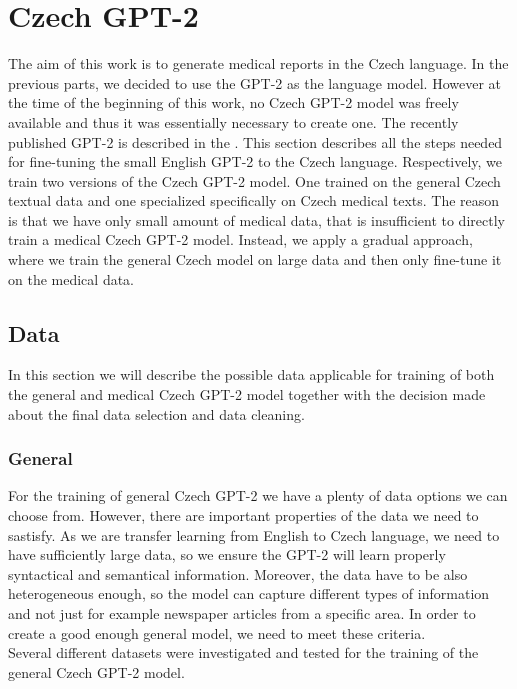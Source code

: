 \section{Czech GPT-2}
\label{sec:czechGpt2}
The aim of this work is to generate medical reports in the Czech language. In the previous parts, we decided to use the GPT-2 as the language model. However at the time of the beginning of this work, no Czech GPT-2 model was freely available and thus it was essentially necessary to create one. The recently published GPT-2 is described in the \citet{hajek_horak2022}. This section describes all the steps needed for fine-tuning the small English GPT-2 to the Czech language. Respectively, we train two versions of the Czech GPT-2 model. One trained on the general Czech textual data and one specialized specifically on Czech medical texts. The reason is that we have only small amount of medical data, that is insufficient to directly train a medical Czech GPT-2 model. Instead, we apply a gradual approach, where we train the general Czech model on large data and then only fine-tune it on the medical data.

\subsection{Data}
\label{sec:gptData}
In this section we will describe the possible data applicable for training of both the general and medical Czech GPT-2 model together with the decision made about the final data selection and data cleaning.

\subsubsection{General}
For the training of general Czech GPT-2 we have a plenty of data options we can choose from. However, there are important properties of the data we need to sastisfy. As we are transfer learning from English to Czech language, we need to have sufficiently large data, so we ensure the GPT-2 will learn properly syntactical and semantical information. Moreover, the data have to be also heterogeneous enough, so the model can capture different types of information and not just for example newspaper articles from a specific area. In order to create a good enough general model, we need to meet these criteria.\\

Several different datasets were investigated and tested for the training of the general Czech GPT-2 model.
